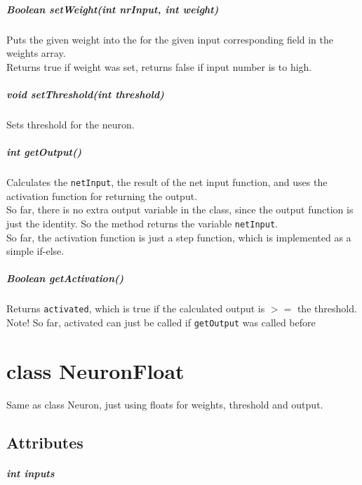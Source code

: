 \paragraph{Boolean setWeight(int nrInput, int weight)}
Puts the given weight into the for the given input corresponding field in the weights array.\\
Returns true if weight was set, returns false if input number is to high.

\paragraph{void setThreshold(int threshold)}
Sets threshold for the neuron.

\paragraph{int getOutput()}
Calculates the \texttt{netInput}, the result of the net input function, and uses the activation function for returning the output.\\
So far, there is no extra output variable in the class, since the output function is just the identity. So the method returns the variable \texttt{netInput}.\\
So far, the activation function is just a step function, which is implemented as a simple if-else.

\paragraph{Boolean getActivation()}
Returns \texttt{activated}, which is true if the calculated output is $>=$ the threshold.\\
Note! So far, activated can just be called if \texttt{getOutput} was called before\\

\chapter{class NeuronFloat}
Same as class Neuron, just using floats for weights, threshold and output.

\section{Attributes}
\paragraph{int inputs}
